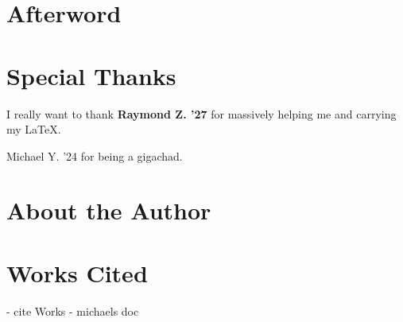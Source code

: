\chapter{Afterword}

\chapter{Special Thanks}
I really want to thank \textbf{Raymond Z. '27} for massively helping me
and carrying my \LaTeX.

Michael Y. '24 for being a gigachad.

\chapter{About the Author}

\chapter{Works Cited}
- cite Works
- michaels doc